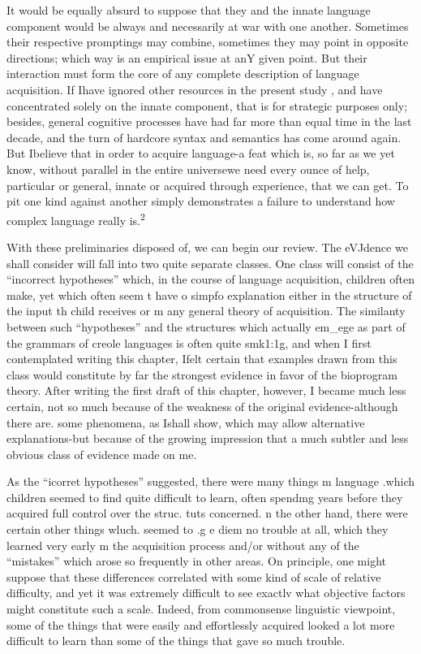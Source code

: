 It would be equally absurd to suppose that they and the innate language component would be always and necessarily at war with one another. Sometimes their respective promptings may combine, some\-times they may point in opposite directions; which way is an empirical issue at anY given point. But their interaction must form the core of any complete description of language acquisition. If Ihave ignored
other resources in the present study , and have concentrated solely on the innate component, that is for strategic purposes only; besides, general cognitive processes have had far more than equal time in the last decade, and the turn of hardcore syntax and semantics has come around again. But Ibelieve that in order to acquire language-a feat which is, so far as we yet know, without parallel in the entire universe\-we need every ounce of help, particular or general, innate or acquired through experience, that we can get. To pit one kind against another simply demonstrates a failure to understand how complex language really is.\textsuperscript{2}



With these preliminaries disposed of, we can begin our review. The eVJdence we shall consider will fall into two quite separate classes. One class will consist of the ``incorrect hypotheses'' which, in the course of language acquisition, children often make, yet which often seem t have o simpfo explanation either in the structure of the input th child receives or m any general theory of acquisition. The simi\-lanty between such ``hypotheses'' and the structures which actually em\_ege as part of the grammars of creole languages is often quite smk1:1g, and when I first contemplated writing this chapter, Ifelt certain that examples drawn from this class would constitute by far
the strongest evidence in favor of the bioprogram theory. After writing
the first draft of this chapter, however, I became much less certain, not so much because of the weakness of the original evidence-although there are. some phenomena, as Ishall show, which may allow alternative explanations{}-but because of the growing impression that a much subtler and less obvious class of evidence made on me.

As the ``icorret hypotheses'' suggested, there were many things m language .which children seemed to find quite difficult to learn, often spendmg years before they acquired full control over the struc. tuts concerned. n the other hand, there were certain other things wluch. seemed to .g e diem no trouble at all, which they learned very early m the acquisition process and/or without any of the ``mistakes'' which arose so frequently in other areas. On principle, one might suppose that these differences correlated with some kind of scale of relative difficulty, and yet it was extremely difficult to see exactlv what objective factors might constitute such a scale. Indeed, from commonsense linguistic viewpoint, some of the things that were easily and effortlessly acquired looked a lot more difficult to learn than some of the things that gave so much trouble.


